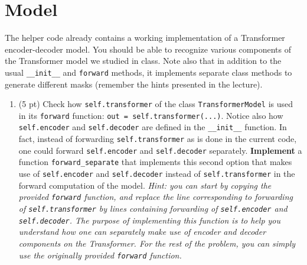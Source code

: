 \documentclass[a4paper,11pt]{article}
\begin{document}

\section{Model}

The helper code already contains a working implementation of a Transformer encoder-decoder model.
You should be able to recognize various components of the Transformer model we studied in class.
Note also that in addition to the usual \texttt{\_\_init\_\_} and \texttt{forward} methods, it implements separate class methods to generate different masks (remember the hints presented in the lecture). 

\begin{enumerate}
\item (5 pt) Check how \texttt{self.transformer} of the class \texttt{TransformerModel} is used in its \texttt{forward} function:
\texttt{out = self.transformer(...)}.
Notice also how \texttt{self.encoder} and \texttt{self.decoder} are defined in the \texttt{\_\_init\_\_} function.
In fact, instead of forwarding \texttt{self.transformer} as is done in the current code, one could forward \texttt{self.encoder} and \texttt{self.decoder} separately. \textbf{Implement} a function \texttt{forward\_separate} that implements this second option that makes use of \texttt{self.encoder} and \texttt{self.decoder} instead of \texttt{self.transformer} in the forward computation of the model.
\textit{Hint: you can start by copying the provided  \texttt{forward} function, and replace the line corresponding to forwarding of \texttt{self.transformer} by lines containing forwarding of \texttt{self.encoder} and \texttt{self.decoder}.
The purpose of implementing this function is to help you understand how one can separately make use of encoder and decoder components on the Transformer. For the rest of the problem, you can simply use the originally provided \texttt{forward} function.}
\end{enumerate}
\end{document}

